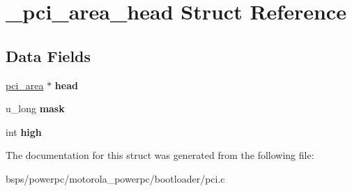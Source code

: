 \hypertarget{struct__pci__area__head}{}\section{\+\_\+pci\+\_\+area\+\_\+head Struct Reference}
\label{struct__pci__area__head}
\subsection*{Data Fields}
\begin{DoxyCompactItemize}
\item 
\mbox{\label{struct__pci__area__head_af394ff616ddac249d49c8d5fb5ea6852}} 
\mbox{\hyperlink{struct__pci__area}{pci\+\_\+area}} $\ast$ {\bfseries head}
\item 
\mbox{\label{struct__pci__area__head_a541410470426a63dfbe53cfced60f665}} 
u\+\_\+long {\bfseries mask}
\item 
\mbox{\label{struct__pci__area__head_a323599c5608abd6e3197c23a75448a93}} 
int {\bfseries high}
\end{DoxyCompactItemize}


The documentation for this struct was generated from the following file\+:\begin{DoxyCompactItemize}
\item 
bsps/powerpc/motorola\+\_\+powerpc/bootloader/pci.\+c\end{DoxyCompactItemize}
